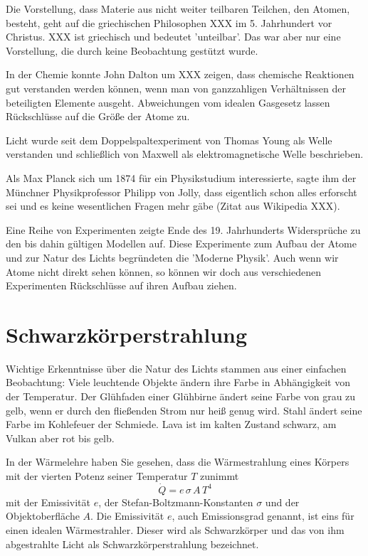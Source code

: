 Die Vorstellung, dass Materie aus nicht weiter teilbaren Teilchen, den Atomen, besteht, geht auf die griechischen Philosophen XXX im 5. Jahrhundert vor Christus. XXX ist griechisch und bedeutet 'unteilbar'. Das war aber nur eine Vorstellung, die durch keine Beobachtung gestützt wurde.

In der Chemie konnte John Dalton um XXX zeigen, dass chemische Reaktionen gut verstanden werden können, wenn man von ganzzahligen Verhältnissen der beteiligten Elemente ausgeht. Abweichungen vom idealen Gasgesetz lassen Rückschlüsse auf die Größe der Atome zu.

Licht wurde seit dem Doppelspaltexperiment von Thomas Young als Welle verstanden und schließlich von Maxwell als elektromagnetische Welle beschrieben.

Als Max Planck sich um 1874 für ein Physikstudium interessierte, sagte ihm der Münchner Physikprofessor Philipp von Jolly, dass eigentlich schon alles erforscht sei und es keine wesentlichen Fragen mehr gäbe (Zitat aus Wikipedia XXX).

Eine Reihe von Experimenten zeigte Ende des 19. Jahrhunderts Widersprüche zu den bis dahin gültigen Modellen auf. Diese Experimente zum Aufbau der Atome und zur Natur des Lichts begründeten die 'Moderne Physik'. Auch wenn wir Atome nicht direkt sehen können, so können wir doch aus verschiedenen Experimenten Rückschlüsse auf ihren Aufbau ziehen.

\section{Schwarzkörperstrahlung}

Wichtige Erkenntnisse über die Natur des Lichts stammen aus einer einfachen Beobachtung: Viele leuchtende Objekte ändern ihre Farbe in Abhängigkeit von der Temperatur. Der Glühfaden einer Glühbirne ändert seine Farbe von grau zu gelb, wenn er durch den fließenden Strom nur heiß genug wird. Stahl ändert seine Farbe im Kohlefeuer der Schmiede. Lava ist im kalten Zustand schwarz, am Vulkan aber rot bis gelb.

In der Wärmelehre haben Sie gesehen, dass die Wärmestrahlung eines Körpers mit der vierten Potenz seiner Temperatur $T$ zunimmt
\begin{equation}
    \dot{Q} = e \, \sigma \, A \, T^4
\end{equation}
mit der Emissivität $e$, der Stefan-Boltzmann-Konstanten $\sigma$ und der Objektoberfläche $A$. Die Emissivität $e$, auch Emissionsgrad genannt, ist eins für einen idealen Wärmestrahler. Dieser wird als Schwarzkörper und das von ihm abgestrahlte Licht als Schwarzkörperstrahlung bezeichnet.

